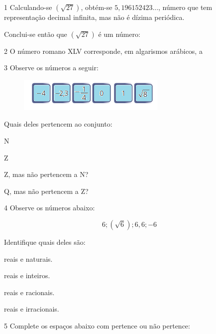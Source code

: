 \num{1} Calculando-se $(\sqrt{27})$, obtém-se $5,196152423$..., número que tem
representação decimal infinita, mas não é dízima periódica.

Conclui-se então que $(\sqrt{27})$ é um número:



\num{2} O número romano XLV corresponde, em algarismos arábicos, a


\num{3} Observe os números a seguir:

\begin{figure}[H]
\centering\includegraphics[width=2.79167in,height=0.63542in]{./imgSAEB_8_MAT/media/image1.png}
\end{figure}

Quais deles pertencem ao conjunto:


\begin{escolha}
\item N 
\item Z 
\item Z, mas não pertencem a N? 
\item Q, mas não pertencem a Z? 
\end{escolha}
\num{4} Observe os números abaixo:

$$6; (\sqrt{6}); 6,6; -6$$


Identifique quais deles são:
\begin{escolha}
\item reais e naturais.
\item reais e inteiros.
\item reais e racionais.
\item reais e irracionais.
\end{escolha}


\num{5} Complete os espaços abaixo com pertence ou não pertence:


